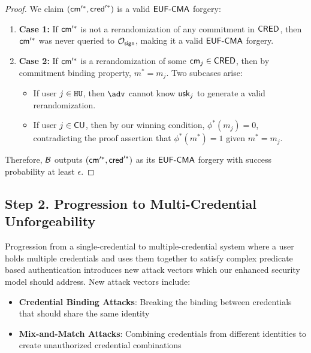 \begin{proof}
\noindent We claim $(\mathsf{cm}'^*, \mathsf{cred}'^*)$ is a valid $\mathsf{EUF\text{-}CMA}$ forgery:
\begin{enumerate}
    \item \textbf{Case 1:} If $\mathsf{cm}'^*$ is not a rerandomization of any commitment in $\mathsf{CRED}$, then $\mathsf{cm}'^*$ was never queried to $\mathcal{O}_{\mathsf{sign}}$, making it a valid $\mathsf{EUF\text{-}CMA}$ forgery.
    \item \textbf{Case 2:} If $\mathsf{cm}'^*$ is a rerandomization of some $\mathsf{cm}_j \in \mathsf{CRED}$, then by commitment binding property, $m^* = m_j$. Two subcases arise:
        \begin{itemize}
            \item If user $j \in \mathtt{HU}$, then $\adv$ cannot know $\mathsf{usk}_j$ to generate a valid rerandomization.
            \item If user $j \in \mathsf{CU}$, then by our winning condition, $\phi^*(m_j) = 0$, contradicting the proof assertion that $\phi^*(m^*) = 1$ given $m^* = m_j$.
        \end{itemize}
\end{enumerate}
Therefore, $\mathcal{B}$ outputs $(\mathsf{cm}'^*, \mathsf{cred}'^*)$ as its $\mathsf{EUF\text{-}CMA}$ forgery with success probability at least $\epsilon$.
\end{proof}


















\newpage
\subsection{Step 2. Progression to Multi-Credential Unforgeability}
Progression from a single-credential to multiple-credential system where a user holds multiple credentials and uses them together to satisfy complex predicate based authentication introduces new attack vectors which our enhanced security model should address. New attack vectors include:

\begin{itemize}
    \item \textbf{Credential Binding Attacks}: Breaking the binding between credentials that should share the same identity
    \item \textbf{Mix-and-Match Attacks}: Combining credentials from different identities to create unauthorized credential combinations
\end{itemize}

